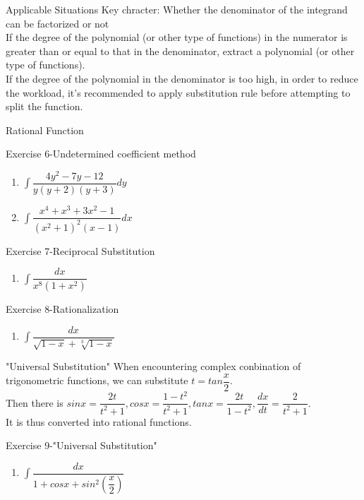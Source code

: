 \begin{frame}{Applicable Situations}
    Key chracter: Whether the denominator of the integrand can be factorized or not\\
    \bigskip
    If the degree of the polynomial (or other type of functions) in the numerator is greater than or equal to that in the denominator, \alert{extract a polynomial (or other type of functions)}.\\
    \bigskip
    If the degree of the polynomial in the denominator is too high, in order to reduce the workload, it's recommended to \alert{apply substitution rule before attempting to split the function}.
\end{frame}

\begin{frame}{Rational Function}
    \begin{block}{Exercise 6-Undetermined coefficient method}
        \begin{enumerate}
            \item $\int \dfrac{4y^2-7y-12}{y(y+2)(y+3)}dy$
            \item $\int \dfrac{x^4+x^3+3x^2-1}{(x^2+1)^2(x-1)}dx$
        \end{enumerate}
    \end{block}
    \begin{block}{Exercise 7-Reciprocal Substitution}
        \begin{enumerate}
            \item $\int \dfrac{dx}{x^8(1+x^2)}$
        \end{enumerate}
    \end{block}
    \begin{block}{Exercise 8-Rationalization}
        \begin{enumerate}
            \item $\int \dfrac{dx}{\sqrt{1-x}+\sqrt[3]{1-x}}$
        \end{enumerate}
    \end{block}
\end{frame}

\begin{frame}{"Universal Substitution"}
    When encountering complex conbination of trigonometric functions, we can substitute $t=tan\dfrac{x}{2}$.\\
    Then there is $sinx=\dfrac{2t}{t^2+1}, cosx=\dfrac{1-t^2}{t^2+1},tanx=\dfrac{2t}{1-t^2},\dfrac{dx}{dt}=\dfrac{2}{t^2+1}$.\\
    It is thus converted into rational functions.
    \vspace{1cm}
    \begin{block}{Exercise 9-"Universal Substitution"}
        \begin{enumerate}
            \item $\int \dfrac{dx}{1+cosx+sin^2(\dfrac{x}{2})}$
        \end{enumerate}
    \end{block}
\end{frame}


